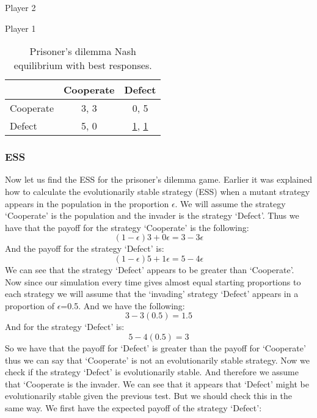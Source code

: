 \documentclass{book}
\begin{document}
\begin{table}[H]
\begin{center}
Player 2

Player 1
\begin{tabular}{|l|c|c|}
\hline
 & Cooperate & Defect\\ 
\hline
Cooperate & 3, 3 & 0, 5\\
\hline
Defect & 5, 0 & \underline{1}, \underline{1}\\
\hline
\end{tabular}

\caption{ Prisoner's dilemma Nash equilibrium with best responses.}
\label{fig:pdnashbr}	
\end{center}
\end{table}


\subsubsection{ESS}
Now let us find the ESS for the prisoner's dilemma game. Earlier it was explained how to calculate the evolutionarily stable strategy (ESS) when a mutant strategy appears in the population in the proportion $\epsilon$. We will assume the strategy  `Cooperate' is the population and the invader is the strategy `Defect'. Thus we have that the payoff for the strategy `Cooperate' is the following:
\begin{equation}
(1-{\epsilon})3 + 0{\epsilon} = 3 - 3{\epsilon}
\end{equation}
And the payoff for the strategy `Defect' is:
\begin{equation}
(1-{\epsilon})5 + 1{\epsilon} = 5 - 4{\epsilon}
\end{equation}
We can see that the strategy `Defect' appears to be greater than `Cooperate'. Now since our simulation every time gives almost equal starting proportions to each strategy we will assume that the `invading' strategy `Defect' appears in a proportion of $\epsilon$=0.5. And we have the following:
\begin{equation}
3 - 3(0.5) = 1.5
\end{equation}
And for the strategy `Defect' is:
\begin{equation}
 5 - 4(0.5) = 3
\end{equation}
So we have that the payoff for `Defect' is greater than the payoff for `Cooperate' thus we can say that `Cooperate' is not an evolutionarily stable strategy.
Now we check if the strategy `Defect' is evolutionarily stable. And therefore we assume that `Cooperate is the invader. We can see that it appears that `Defect' might be evolutionarily stable given the previous test. But we should check this in the same way. We first have the expected payoff of the strategy `Defect':
\end{document}
